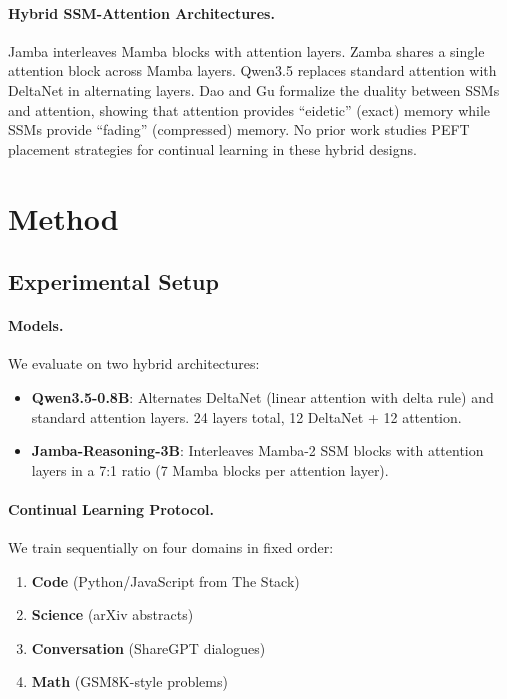 \documentclass{article}
\begin{document}
\paragraph{Hybrid SSM-Attention Architectures.}
Jamba \cite{jamba2024} interleaves Mamba \cite{gu2023mamba} blocks with attention layers. Zamba \cite{zamba2024} shares a single attention block across Mamba layers. Qwen3.5 \cite{qwen2025} replaces standard attention with DeltaNet \cite{yang2024deltanet} in alternating layers. Dao and Gu \cite{dao2024mamba2} formalize the duality between SSMs and attention, showing that attention provides ``eidetic'' (exact) memory while SSMs provide ``fading'' (compressed) memory. No prior work studies PEFT placement strategies for continual learning in these hybrid designs.

\section{Method}

\subsection{Experimental Setup}

\paragraph{Models.} We evaluate on two hybrid architectures:
\begin{itemize}
    \item \textbf{Qwen3.5-0.8B}: Alternates DeltaNet (linear attention with delta rule) and standard attention layers. 24 layers total, 12 DeltaNet + 12 attention.
    \item \textbf{Jamba-Reasoning-3B}: Interleaves Mamba-2 SSM blocks with attention layers in a 7:1 ratio (7 Mamba blocks per attention layer).
\end{itemize}

\paragraph{Continual Learning Protocol.}
We train sequentially on four domains in fixed order:
\begin{enumerate}
    \item \textbf{Code} (Python/JavaScript from The Stack)
    \item \textbf{Science} (arXiv abstracts)
    \item \textbf{Conversation} (ShareGPT dialogues)
    \item \textbf{Math} (GSM8K-style problems)
\end{enumerate}
\end{document}
